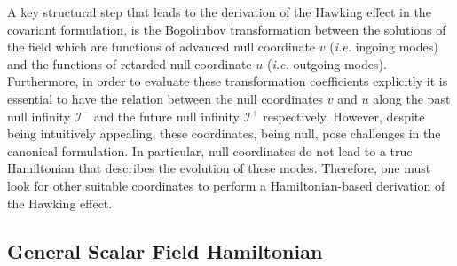 \documentclass[aps,twocolumn,showpacs]{revtex4}
\def\scriplus{\mathscr{I}^{+}}
\def\scriminus{\mathscr{I}^{-}}
\begin{document}
A key structural step that leads to the derivation of the Hawking effect in the 
covariant formulation, is the Bogoliubov transformation between the solutions of 
the field which are functions of advanced null coordinate $v$ (\emph{i.e.} 
ingoing modes) and the functions of retarded null coordinate $u$ (\emph{i.e.} 
outgoing modes). Furthermore, in order to evaluate these transformation 
coefficients explicitly it is essential to have the relation between the null 
coordinates $v$ and $u$ along the past null infinity $\scriminus$ and the future 
null infinity $\scriplus$ respectively. However, despite being intuitively 
appealing, these coordinates, being null, pose challenges in the canonical 
formulation. In particular, null coordinates do not lead to a true Hamiltonian 
that describes the evolution of these modes. Therefore, one must look for other 
suitable coordinates to perform a Hamiltonian-based derivation of the Hawking 
effect.



\subsection{General Scalar Field Hamiltonian}
\end{document}
